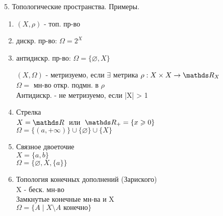 \documentclass[11pt, fleqn]{article}
\begin{document}
\begin{question}{5. Топологические пространства. Примеры.}
        \begin{examples}
            \begin{enumerate}
                \item $(X, \rho)$ - топ. пр-во
                \item дискр. пр-во: $\Omega = 2^X$
                \item антидискр. пр-во: $\Omega = \{\varnothing, X\}$

            \begin{definition}
                $(X, \Omega)$ - метризуемо, если $\exists$ метрика $\rho: X \times X \rightarrow \R_X$\\
                $\Omega = $ мн-во откр. подмн. в $\rho$\\
                Антидискр. - не метризуемо, если |X| > 1
            \end{definition}
                \item Стрелка\\
                      $X = \R  \;$ или $\;  \R_+ = \{x \geq 0\}$\\
                      $\Omega = \{(a, +\infty)\} \cup \{\varnothing\} \cup \{X\}$
                \item Связное двоеточие\\
                      $X = \{a, b\}$\\
                      $\Omega = \{\varnothing, X, \{a\}\}$
                \item Топология конечных дополнений (Зариского)\\
                      X - беск. мн-во\\
                      Замкнутые конечные мн-ва и X \\
                      $\Omega = \{A \; | \; X \setminus A \text{ конечно}\}$
            \end{enumerate}
        \end{examples}
    \end{question}
\end{document}
